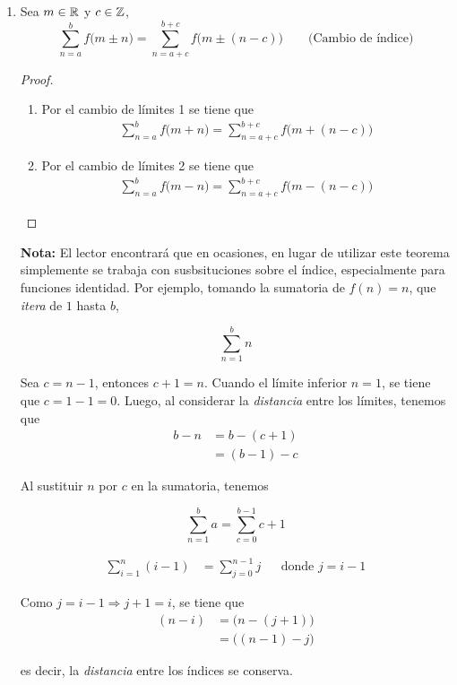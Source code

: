 \begin{enumerate}[label=\alph*)]
  \item Sea $m\in \mathbb{R}$ y $c\in \mathbb{Z}$, \[\sum_{n=a}^{b}f\bigl(m\pm n\bigr) = \sum_{n=a+c}^{b+c}f\bigl(m\pm (n- c)\bigr) \qquad \text{(Cambio de índice)}\]
  \begin{proof}\leavevmode
    \begin{enumerate}[label=\roman*)]
      \item Por el cambio de límites 1 se tiene que 
      \begin{align*}
        \sum_{n=a}^{b}f\bigl(m+ n\bigr) = \sum_{n=a+c}^{b+c}f\bigl(m+ (n- c)\bigr)
      \end{align*}
      \item Por el cambio de límites 2 se tiene que
      \begin{align*}
        \sum_{n=a}^{b}f\bigl(m-n\bigr) = \sum_{n=a+c}^{b+c}f\bigl(m-(n- c)\bigr)
      \end{align*}
    \end{enumerate}
  \end{proof}

  \textbf{Nota:} El lector encontrará que en ocasiones, en lugar de utilizar este teorema simplemente se trabaja con susbsituciones sobre el índice, especialmente para funciones identidad. Por ejemplo, tomando la sumatoria de $f(n)=n$, que \textit{itera} de $1$ hasta $b$,
  
  \[\sum_{n=1}^{b} n\]
  
  Sea $c=n-1$, entonces $c+1=n$. Cuando el límite inferior $n=1$, se tiene que $c=1-1=0$. Luego, al considerar la \textit{distancia} entre los límites, tenemos que
  \begin{align*}
    b - n &= b - (c+1)\\
    &= (b-1) - c
  \end{align*}
  
  Al sustituir $n$ por $c$ en la sumatoria, tenemos
  
  \[\sum_{n=1}^{b} a = \sum_{c=0}^{b-1} c+1\]

  \begin{align*}
    \sum_{i=1}^{n} (i-1) &= \sum_{j=0}^{n-1} j && \text{donde $j=i-1$}
  \end{align*}
  
  Como $j=i-1 \Rightarrow j+1=i$, se tiene que
  \begin{align*}
    (n-i) &= \big(n-(j+1)\big)\\
    &= \big((n-1)-j\big)
  \end{align*}
  
  es decir, la \textit{distancia} entre los índices se conserva.


\end{enumerate}

